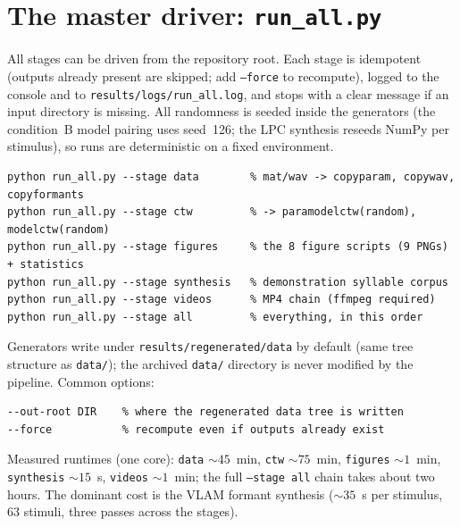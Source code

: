 \documentclass[11pt,a4paper]{article}
\begin{document}
\section{The master driver: \texttt{run\_all.py}}
All stages can be driven from the repository root. Each stage is
idempotent (outputs already present are skipped; add \texttt{--force} to
recompute), logged to the console and to
\texttt{results/logs/run\_all.log}, and stops with a clear message if an
input directory is missing. All randomness is seeded inside the
generators (the condition~B model pairing uses seed~126; the LPC
synthesis reseeds NumPy per stimulus), so runs are deterministic on a
fixed environment.
\begin{lstlisting}
python run_all.py --stage data        % mat/wav -> copyparam, copywav, copyformants
python run_all.py --stage ctw         % -> paramodelctw(random), modelctw(random)
python run_all.py --stage figures     % the 8 figure scripts (9 PNGs) + statistics
python run_all.py --stage synthesis   % demonstration syllable corpus
python run_all.py --stage videos      % MP4 chain (ffmpeg required)
python run_all.py --stage all         % everything, in this order
\end{lstlisting}
Generators write under \texttt{results/regenerated/data} by default (same
tree structure as \texttt{data/}); the archived \texttt{data/} directory
is never modified by the pipeline. Common options:
\begin{lstlisting}
--out-root DIR    % where the regenerated data tree is written
--force           % recompute even if outputs already exist
\end{lstlisting}
Measured runtimes (one core): \texttt{data} ${\sim}45$~min,
\texttt{ctw} ${\sim}75$~min, \texttt{figures} ${\sim}1$~min,
\texttt{synthesis} ${\sim}15$~s, \texttt{videos} ${\sim}1$~min; the full
\texttt{--stage all} chain takes about two hours. The dominant cost is
the VLAM formant synthesis (${\sim}35$~s per stimulus, 63 stimuli, three
passes across the stages).
\end{document}
